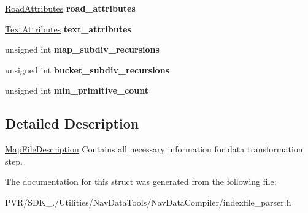 \begin{DoxyCompactItemize}
\item 
\hypertarget{struct_map_file_description_abbed5f1a812f87bfa51a730707915cd4}{\hyperlink{struct_road_attributes}{Road\+Attributes} {\bfseries road\+\_\+attributes}}\label{struct_map_file_description_abbed5f1a812f87bfa51a730707915cd4}

\item 
\hypertarget{struct_map_file_description_a38863a90d9524d911f56412af235b660}{\hyperlink{struct_text_attributes}{Text\+Attributes} {\bfseries text\+\_\+attributes}}\label{struct_map_file_description_a38863a90d9524d911f56412af235b660}

\item 
\hypertarget{struct_map_file_description_aca8098c9d9a8f46fa0f0353c3fbd512e}{unsigned int {\bfseries map\+\_\+subdiv\+\_\+recursions}}\label{struct_map_file_description_aca8098c9d9a8f46fa0f0353c3fbd512e}

\item 
\hypertarget{struct_map_file_description_a26196e4712c8dfc5c4bb7149955dcb7c}{unsigned int {\bfseries bucket\+\_\+subdiv\+\_\+recursions}}\label{struct_map_file_description_a26196e4712c8dfc5c4bb7149955dcb7c}

\item 
\hypertarget{struct_map_file_description_a22f56e98e7e7e901291ce92b31cf3bfb}{unsigned int {\bfseries min\+\_\+primitive\+\_\+count}}\label{struct_map_file_description_a22f56e98e7e7e901291ce92b31cf3bfb}

\end{DoxyCompactItemize}


\subsection{Detailed Description}


  \hyperlink{struct_map_file_description}{Map\+File\+Description}  Contains all necessary information for data transformation step. 

The documentation for this struct was generated from the following file\+:\begin{DoxyCompactItemize}
\item 
P\+V\+R/\+S\+D\+K\+\_./\+Utilities/\+Nav\+Data\+Tools/\+Nav\+Data\+Compiler/indexfile\+\_\+parser.\+h\end{DoxyCompactItemize}
